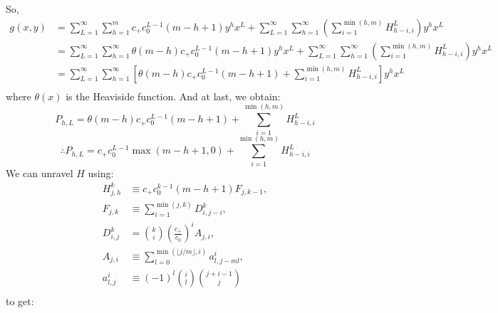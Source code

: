 	So,
	\begin{align}
		g(x, y) &= \sum_{L=1}^\infty \sum_{h=1}^m  c_+ c_0^{L-1}(m - h + 1) y^hx^L + \sum_{L=1}^\infty \sum_{h=1}^\infty \left(\sum_{i=1}^{\min(h, m)} H_{h-i, i}^L \right) y^hx^{L}\\
		&= \sum_{L=1}^\infty \sum_{h=1}^\infty \theta(m-h) c_+ c_0^{L-1}(m - h + 1) y^hx^L + \sum_{L=1}^\infty \sum_{h=1}^\infty \left(\sum_{i=1}^{\min(h, m)} H_{h-i, i}^L \right) y^hx^{L}\\
		&= \sum_{L=1}^\infty \sum_{h=1}^\infty \left[ \theta(m-h)c_+ c_0^{L-1}(m - h + 1) + \sum_{i=1}^{\min(h, m)} H_{h-i, i}^L\right] y^hx^{L}\\
	\end{align}
	where $\theta(x)$ is the Heaviside function. And at last, we obtain:
	\begin{equation}
		P_{h, L} = \theta(m-h)c_+ c_0^{L-1}(m - h + 1) + \sum_{i=1}^{\min(h, m)} H_{h-i, i}^L
	\end{equation}
	\begin{equation}
		\boxed{\therefore P_{h, L} = c_+ c_0^{L-1}\max(m - h + 1, 0) + \sum_{i=1}^{\min(h, m)} H_{h-i, i}^L }
	\end{equation}
	We can unravel $H$ using:
	\begin{align}
		H_{j, h}^k &\equiv   c_+c_0^{k-1} (m - h + 1)F_{j, k-1},\\
		F_{j, k} &\equiv \sum_{i=1}^{\min(j, k)}D_{i, j-i}^k,\\
		D_{i, j}^k &= {k \choose i}  \left(\frac{c_+}{c_0}\right)^i  A_{j, i},\\
		A_{j, i} &\equiv \sum_{l=0}^{\min(\lfloor j / m \rfloor, i)} a_{l, j-ml}^i,\\
		a_{l, j}^i &\equiv (-1)^l  {i \choose l} {j+i-1\choose j}\\
	\end{align}
	to get:
